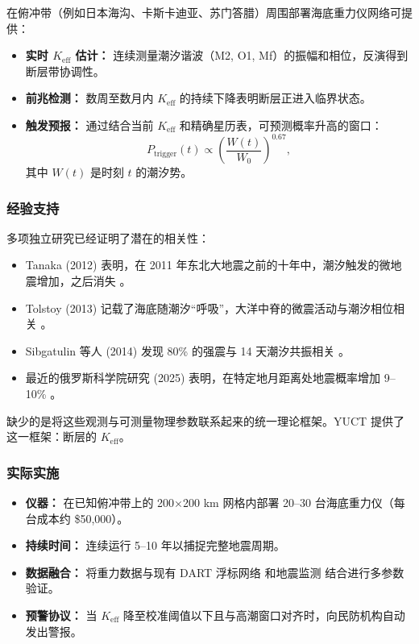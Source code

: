 \documentclass[12pt,a4paper]{article}
\theoremstyle{remark}
\begin{document}
	在俯冲带（例如日本海沟、卡斯卡迪亚、苏门答腊）周围部署海底重力仪网络可提供：
	\begin{itemize}
		\item \textbf{实时 \(K_{\mathrm{eff}}\) 估计：} 连续测量潮汐谐波（M2, O1, Mf）的振幅和相位，反演得到断层带协调性。
		\item \textbf{前兆检测：} 数周至数月内 \(K_{\mathrm{eff}}\) 的持续下降表明断层正进入临界状态。
		\item \textbf{触发预报：} 通过结合当前 \(K_{\mathrm{eff}}\) 和精确星历表，可预测概率升高的窗口：
		\[
		P_{\text{trigger}}(t) \propto \left( \frac{W(t)}{W_0} \right)^{0.67},
		\]
		其中 \(W(t)\) 是时刻 \(t\) 的潮汐势。
	\end{itemize}
	
	\subsubsection{经验支持}
	
	多项独立研究已经证明了潜在的相关性：
	\begin{itemize}
		\item Tanaka (2012) 表明，在 2011 年东北大地震之前的十年中，潮汐触发的微地震增加，之后消失 \cite{Tanaka2012}。
		\item Tolstoy (2013) 记载了海底随潮汐“呼吸”，大洋中脊的微震活动与潮汐相位相关 \cite{Tolstoy2013}。
		\item Sibgatulin 等人 (2014) 发现 80\% 的强震与 14 天潮汐共振相关 \cite{Sibgatulin2014}。
		\item 最近的俄罗斯科学院研究 (2025) 表明，在特定地月距离处地震概率增加 9–10\% \cite{RAN2025}。
	\end{itemize}
	
	缺少的是将这些观测与可测量物理参数联系起来的统一理论框架。YUCT 提供了这一框架：断层的 \(K_{\mathrm{eff}}\)。
	
	\subsubsection{实际实施}
	
	\begin{itemize}
		\item \textbf{仪器：} 在已知俯冲带上的 200×200 km 网格内部署 20–30 台海底重力仪（每台成本约 \$50,000）。
		\item \textbf{持续时间：} 连续运行 5–10 年以捕捉完整地震周期。
		\item \textbf{数据融合：} 将重力数据与现有 DART 浮标网络 \cite{NOAA2024} 和地震监测 \cite{USGS2024} 结合进行多参数验证。
		\item \textbf{预警协议：} 当 \(K_{\mathrm{eff}}\) 降至校准阈值以下且与高潮窗口对齐时，向民防机构自动发出警报。
	\end{itemize}
	
\end{document}

